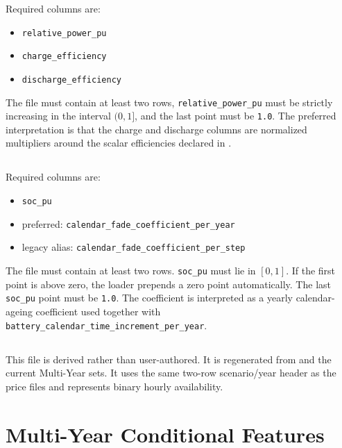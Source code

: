 \documentclass[11pt,a4paper]{report}
\newcommand{\code}[1]{\texttt{#1}}
\begin{document}
Required columns are:

\begin{itemize}[leftmargin=1.5em]
  \item \code{relative\_power\_pu}
  \item \code{charge\_efficiency}
  \item \code{discharge\_efficiency}
\end{itemize}

The file must contain at least two rows, \code{relative\_power\_pu} must be strictly increasing in the interval $(0,1]$, and the last point must be \code{1.0}. The preferred interpretation is that the charge and discharge columns are normalized multipliers around the scalar efficiencies declared in .

\section{}

Required columns are:

\begin{itemize}[leftmargin=1.5em]
  \item \code{soc\_pu}
  \item preferred: \code{calendar\_fade\_coefficient\_per\_year}
  \item legacy alias: \code{calendar\_fade\_coefficient\_per\_step}
\end{itemize}

The file must contain at least two rows. \code{soc\_pu} must lie in $[0,1]$. If the first point is above zero, the loader prepends a zero point automatically. The last \code{soc\_pu} point must be \code{1.0}. The coefficient is interpreted as a yearly calendar-ageing coefficient used together with \code{battery\_calendar\_time\_increment\_per\_year}.

\section{}

This file is derived rather than user-authored. It is regenerated from  and the current Multi-Year sets. It uses the same two-row scenario/year header as the price files and represents binary hourly availability.

\chapter{Multi-Year Conditional Features}\label{sec:multi-year-conditional}
\end{document}
